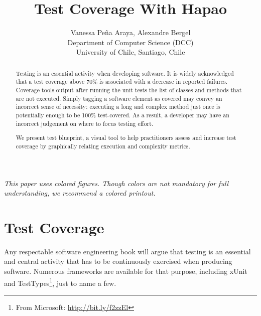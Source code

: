 \documentclass{sig-alternate}
\newcommand{\Title}{Test Coverage With Hapao}
\newcommand{\TitleShort}{\Title}
\newcommand{\Authors}{Vanessa Pe\~na Araya, Alexandre Bergel}
\newcommand{\AuthorsShort}{V. Pe\~na, A. Bergel}
\newcommand{\seclabel}[1]{\label{sec:#1}}
\begin{document}
\title{\Title}

\author{\Authors\\[3mm]
Department of Computer Science (DCC)\\ University of Chile, Santiago, Chile\\[1 ex]
} 

\maketitle

\emph{This paper uses colored figures. Though colors are not mandatory for full understanding, we recommend a colored printout.\\}

\begin{abstract}
Testing is an essential activity when developing software. It is widely acknowledged that a test coverage above 70\% is associated with a decrease in reported failures. Coverage tools output after running the unit tests the list of classes and methods that are not executed. Simply tagging a software element as covered may convey an incorrect sense of necessity: executing a long and complex method just once is potentially enough to be 100\% test-covered. As a result, a developer may have an incorrect judgement on where to focus testing effort.

We present test blueprint, a visual tool to help practitioners assess and increase test coverage by graphically relating execution and complexity metrics.
\end{abstract}

\section{Test Coverage}\seclabel{introduction}

Any respectable software engineering book will argue that testing is an essential and central activity that has to be continuously exercised when producing software. Numerous frameworks are available for that purpose, including xUnit and TestTypes\footnote{From Microsoft: \url{http://bit.ly/f2zzEl}}, just to name a few.

%
\end{document}
